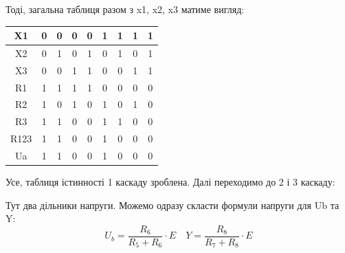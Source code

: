 \documentclass[a4paper,14pt]{extreport}
\begin{document}
	Тоді, загальна таблиця разом з x1, x2, x3 матиме вигляд:


	\begin{table}[h]
	  \begin{center}
	    \begin{tabular}{|c|c|c|c|c|c|c|c|c|}
	    \hline
	    X1   & 0 & 0 & 0 & 0 & 1 & 1 & 1 & 1 \\ \hline
	    X2   & 0 & 1 & 0 & 1 & 0 & 1 & 0 & 1 \\ \hline
	    X3   & 0 & 0 & 1 & 1 & 0 & 0 & 1 & 1 \\ \hline
	    R1   & 1 & 1 & 1 & 1 & 0 & 0 & 0 & 0 \\ \hline
	    R2   & 1 & 0 & 1 & 0 & 1 & 0 & 1 & 0 \\ \hline
	    R3   & 1 & 1 & 0 & 0 & 1 & 1 & 0 & 0 \\ \hline
	    R123 & 1 & 1 & 0 & 0 & 1 & 0 & 0 & 0 \\ \hline
	    Ua   & 1 & 1 & 0 & 0 & 1 & 0 & 0 & 0 \\ \hline
	    \end{tabular}
	  \end{center}
	\end{table}


	Усе, таблиця істинності 1 каскаду зроблена. Далі переходимо до 2 і 3 каскаду:




	\begin{figure}[h!]
	\label{ris5}
	\end{figure}
	Тут два дільники напруги. Можемо одразу скласти формули напруги для Ub та Y:
	\begin{equation}
	U_{b}=\dfrac{R_{6}}{R_{5}+R_{6}} \cdot E \quad Y=\dfrac{R_{8}}{R_{7}+R_{8}} \cdot E
	\end{equation}
\end{document}

